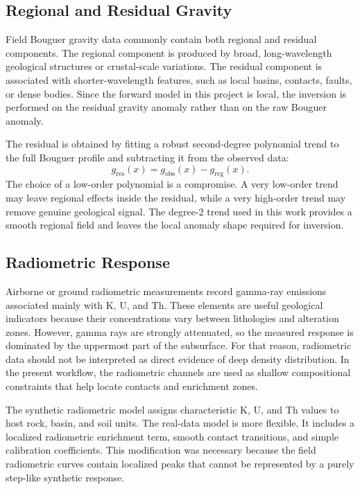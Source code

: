 \documentclass[12pt,a4paper]{article}
\begin{document}
\subsection{Regional and Residual Gravity}
Field Bouguer gravity data commonly contain both regional and residual components. The regional component is produced by broad, long-wavelength geological structures or crustal-scale variations. The residual component is associated with shorter-wavelength features, such as local basins, contacts, faults, or dense bodies. Since the forward model in this project is local, the inversion is performed on the residual gravity anomaly rather than on the raw Bouguer anomaly.

The residual is obtained by fitting a robust second-degree polynomial trend to the full Bouguer profile and subtracting it from the observed data:
\begin{equation}
    g_{\mathrm{res}}(x) = g_{\mathrm{obs}}(x) - g_{\mathrm{reg}}(x).
\end{equation}
The choice of a low-order polynomial is a compromise. A very low-order trend may leave regional effects inside the residual, while a very high-order trend may remove genuine geological signal. The degree-2 trend used in this work provides a smooth regional field and leaves the local anomaly shape required for inversion.

\subsection{Radiometric Response}
Airborne or ground radiometric measurements record gamma-ray emissions associated mainly with K, U, and Th. These elements are useful geological indicators because their concentrations vary between lithologies and alteration zones. However, gamma rays are strongly attenuated, so the measured response is dominated by the uppermost part of the subsurface. For that reason, radiometric data should not be interpreted as direct evidence of deep density distribution. In the present workflow, the radiometric channels are used as shallow compositional constraints that help locate contacts and enrichment zones.

The synthetic radiometric model assigns characteristic K, U, and Th values to host rock, basin, and soil units. The real-data model is more flexible. It includes a localized radiometric enrichment term, smooth contact transitions, and simple calibration coefficients. This modification was necessary because the field radiometric curves contain localized peaks that cannot be represented by a purely step-like synthetic response.
\end{document}
